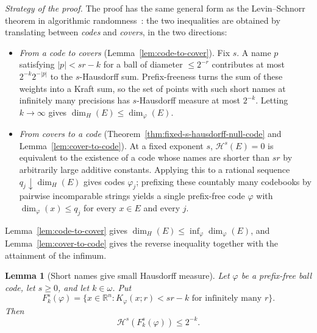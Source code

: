 \documentclass[a4paper,oneside,reqno,12pt]{amsart}
\theoremstyle{plain}
\newtheorem{lemma}[theorem]{Lemma}
\theoremstyle{definition}
\theoremstyle{remark}
\begin{document}
\medskip
\noindent\textit{Strategy of the proof.}
The proof has the same general form as the Levin--Schnorr theorem in
algorithmic randomness~\cite[Theorem~6.2.3]{DowneyHirschfeldt2010}: the two
inequalities are obtained by translating between \emph{codes} and
\emph{covers}, in the two directions:
\begin{itemize}
\item \emph{From a code to covers} (Lemma~\ref{lem:code-to-cover}).
  Fix \(s\).  A name \(p\) satisfying \(|p|<sr-k\) for a ball of diameter
  \(\le2^{-r}\) contributes at most \(2^{-k}2^{-|p|}\) to the \(s\)-Hausdorff
  sum.  Prefix-freeness turns the sum of these weights into a Kraft sum, so the
  set of points with such short names at infinitely many precisions has
  \(s\)-Hausdorff measure at most \(2^{-k}\).  Letting \(k\to\infty\) gives
  \(\dim_H(E)\le\dim_\varphi(E)\).
\item \emph{From covers to a code} (Theorem~\ref{thm:fixed-s-hausdorff-null-code}
  and Lemma~\ref{lem:cover-to-code}).  At a fixed exponent \(s\),
  \(\mathcal H^s(E)=0\) is equivalent to the existence of a code whose names
  are shorter than \(sr\) by arbitrarily large additive constants.  Applying
  this to a rational sequence \(q_j\downarrow\dim_H(E)\) gives codes
  \(\varphi_j\); prefixing these countably many codebooks by pairwise
  incomparable strings yields a single prefix-free code \(\varphi\) with
  \(\dim_\varphi(x)\le q_j\) for every \(x\in E\) and every \(j\).
\end{itemize}
Lemma~\ref{lem:code-to-cover} gives \(\dim_H(E)\le\inf_\varphi\dim_\varphi(E)\),
and Lemma~\ref{lem:cover-to-code} gives the reverse inequality together with the
attainment of the infimum.




\begin{lemma}[Short names give small Hausdorff measure]
\label{lem:short-names-small-measure}
Let \(\varphi\) be a prefix-free ball code, let \(s\ge0\), and let
\(k\in\omega\).  Put
\[
F_k^s(\varphi)
=
\bigl\{x\in\mathbb R^n:
K_\varphi(x;r)<sr-k\text{ for infinitely many }r\bigr\}.
\]
Then
\[
\mathcal H^s(F_k^s(\varphi))\le 2^{-k}.
\]
\end{lemma}
\end{document}
